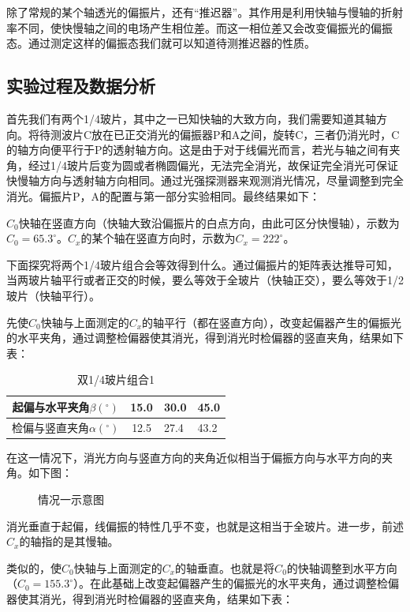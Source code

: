 \documentclass[12pt]{article}
\begin{document}
除了常规的某个轴透光的偏振片，还有“推迟器”。其作用是利用快轴与慢轴的折射率不同，使快慢轴之间的电场产生相位差。而这一相位差又会改变偏振光的偏振态。通过测定这样的偏振态我们就可以知道待测推迟器的性质。

\subsection{实验过程及数据分析}

首先我们有两个1/4玻片，其中之一已知快轴的大致方向，我们需要知道其轴方向。将待测波片C放在已正交消光的偏振器P和A之间，旋转C，三者仍消光时，C的轴方向便平行于P的透射轴方向。这是由于对于线偏光而言，若光与轴之间有夹角，经过1/4玻片后变为圆或者椭圆偏光，无法完全消光，故保证完全消光可保证快慢轴方向与透射轴方向相同。通过光强探测器来观测消光情况，尽量调整到完全消光。偏振片P，A的配置与第一部分实验相同。最终结果如下：

$C_0$快轴在竖直方向（快轴大致沿偏振片的白点方向，由此可区分快慢轴），示数为$C_0=65.3^\circ$。$C_x$的某个轴在竖直方向时，示数为$C_x=222^\circ$。

下面探究将两个1/4玻片组合会等效得到什么。通过偏振片的矩阵表达推导可知，当两玻片轴平行或者正交的时候，要么等效于全玻片（快轴正交），要么等效于1/2玻片（快轴平行）。

先使$C_0$快轴与上面测定的$C_x$的轴平行（都在竖直方向），改变起偏器产生的偏振光的水平夹角，通过调整检偏器使其消光，得到消光时检偏器的竖直夹角，结果如下表：

\begin{table}[H]
    \centering
    \begin{tabular}{|c|c|l|l|}
    \hline
    起偏与水平夹角$\beta (^\circ)$  & 15.0 & 30.0 & 45.0 \\ \hline
    检偏与竖直夹角$\alpha (^\circ)$ & 12.5 & 27.4 & 43.2 \\ \hline
    \end{tabular}
    \caption{双1/4玻片组合1}
    \label{tab:A3}
\end{table}

在这一情况下，消光方向与竖直方向的夹角近似相当于偏振方向与水平方向的夹角。如下图：
 
\begin{figure}[H]
    \centering
    
    \caption{情况一示意图}
    \label{fig:2}
\end{figure}

消光垂直于起偏，线偏振的特性几乎不变，也就是这相当于全玻片。进一步，前述$C_x$的轴指的是其慢轴。

类似的，使$C_0$快轴与上面测定的$C_x$的轴垂直。也就是将$C_0$的快轴调整到水平方向（$C_0=155.3^\circ$）。在此基础上改变起偏器产生的偏振光的水平夹角，通过调整检偏器使其消光，得到消光时检偏器的竖直夹角，结果如下表：
\end{document}
